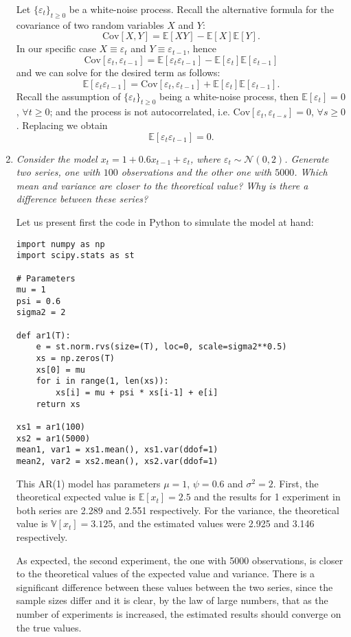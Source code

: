 \documentclass[fleqn]{article}
\newcommand{\E}[1]{\mathbb{E}\left[#1 \right]}
\newcommand{\V}[1]{\mathbb{V}\left[#1 \right]}
\newcommand{\cov}[1]{\mathrm{Cov}\left[#1 \right]}
\begin{document}
\begin{enumerate}
Let $\{\varepsilon_t\}_{t\geq0}$ be a white-noise process. Recall the alternative formula for the covariance of two random variables $X$ and $Y$:
\[
\cov{X,Y}=\E{XY} - \E{X}\E{Y}.
\]
In our specific case $X\equiv\varepsilon_t$ and $Y\equiv\varepsilon_{t-1}$, hence
\[
\cov{\varepsilon_t,\varepsilon_{t-1}}=\E{\varepsilon_t\varepsilon_{t-1}} - \E{\varepsilon_t}\E{\varepsilon_{t-1}}
\]
and we can solve for the desired term as follows:
\[
\E{\varepsilon_t\varepsilon_{t-1}}=\cov{\varepsilon_t,\varepsilon_{t-1}} + \E{\varepsilon_t}\E{\varepsilon_{t-1}}.
\]
Recall the assumption of $\{\varepsilon_t\}_{t\geq0}$ being a white-noise process, then $\E{\varepsilon_t}=0$, $\forall t\geq0$; and the process is not autocorrelated, i.e. $\cov{\varepsilon_t,\varepsilon_{t-s}}=0$, $\forall s\geq0$. Replacing we obtain
\[
\E{\varepsilon_t\varepsilon_{t-1}}=0.
\]
\newpage
\item \textit{Consider the model $x_t=1+0.6x_{t-1}+\varepsilon_t$, where $\varepsilon_t\sim\mathcal{N}(0,2)$. Generate two series, one with $100$ observations and the other one with $5000$. Which mean and variance are closer to the theoretical value? Why is there a difference between these series?}

Let us present first the code in Python to simulate the model at hand:
\begin{verbatim}
import numpy as np
import scipy.stats as st

# Parameters
mu = 1
psi = 0.6
sigma2 = 2

def ar1(T):
    e = st.norm.rvs(size=(T), loc=0, scale=sigma2**0.5)
    xs = np.zeros(T)
    xs[0] = mu
    for i in range(1, len(xs)):
        xs[i] = mu + psi * xs[i-1] + e[i]
    return xs

xs1 = ar1(100)
xs2 = ar1(5000)
mean1, var1 = xs1.mean(), xs1.var(ddof=1)
mean2, var2 = xs2.mean(), xs2.var(ddof=1)
\end{verbatim}

This AR(1) model has parameters $\mu=1$, $\psi=0.6$ and $\sigma^2=2$. First, the theoretical expected value is $\E{x_t}=2.5$ and the results for 1 experiment in both series are 2.289 and 2.551 respectively. For the variance, the theoretical value is $\V{x_t}=3.125$, and the estimated values were 2.925 and 3.146 respectively.

As expected, the second experiment, the one with 5000 observations, is closer to the theoretical values of the expected value and variance. There is a significant difference between these values between the two series, since the sample sizes differ and it is clear, by the law of large numbers, that as the number of experiments is increased, the estimated results should converge on the true values.

\end{enumerate}
\end{document}
